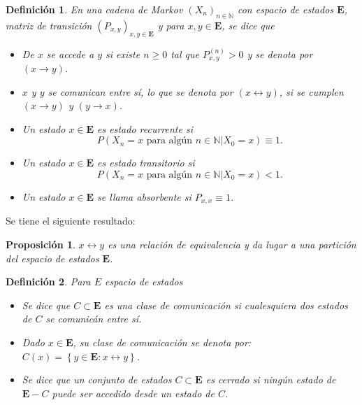 \documentclass{article}
\newtheorem{Def}{Definición}[section]
\newtheorem{Prop}{Proposición}[section]
\newcommand{\nat}{\mathbb{N}}
\newcommand{\Eb}{\mathbf{E}}
\numberwithin{equation}{section}
\begin{document}
\begin{Def}
En una cadena de Markov $\left(X_{n}\right)_{n\in\nat}$ con espacio de estados $\Eb$, matriz de transici\'on $\left(P_{x,y}\right)_{x,y\in\Eb}$ y para $x,y\in\Eb$,  se dice que
\begin{itemize}
\item[a) ]  De $x$ se accede a $y$ si existe $n\geq0$ tal que $P_{x,y}^{(n)}>0$ y se denota por $\left(x\rightarrow y\right)$.

\item[b) ] $x$ y $y$ se comunican entre s\'i, lo que se denota por $\left(x\leftrightarrow y\right)$, si se cumplen $\left(x\rightarrow y\right)$ y $\left(y\rightarrow x\right)$.

\item[c) ] Un estado $x\in\Eb$ es estado recurrente si $$P\left(X_{n}=x\textrm{ para alg\'un }n\in\nat|X_{0}=x \right)\equiv1.$$ 

\item[d) ] Un estado $x\in\Eb$ es estado transitorio si $$P\left(X_{n}=x\textrm{ para alg\'un }n\in\nat|X_{0}=x \right)<1.$$ 

\item[e) ] Un estado $x\in\Eb$ se llama absorbente si $P_{x,x}\equiv1$.
\end{itemize}
\end{Def}

Se tiene el siguiente resultado:

\begin{Prop}
$x\leftrightarrow y$ es una relaci\'on de equivalencia y da lugar a una partici\'on del espacio de estados $\Eb$.
\end{Prop}

\begin{Def}
Para $E$ espacio de estados
\begin{itemize}

\item[a)  ] Se dice que $C\subset \Eb$ es una clase de comunicaci\'on si cualesquiera dos estados de $C$ se comunic\'an entre s\'i.

\item[b)  ] Dado $x\in\Eb$, su clase de comunicaci\'on se denota por: $C\left(x\right)=\left\{y\in\Eb:x\leftrightarrow y\right\}$.

\item[c)  ] Se dice que un conjunto de estados  $C\subset \Eb$ es cerrado si ning\'un estado de $\Eb-C$ puede ser accedido desde un estado de $C$.
\end{itemize}
\end{Def}
\end{document}
